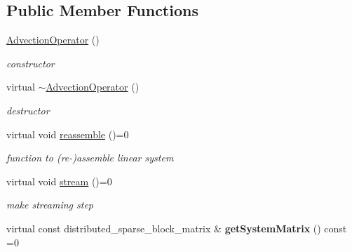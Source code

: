 \subsection*{Public Member Functions}
\begin{DoxyCompactItemize}
\item 
\hypertarget{classnatrium_1_1AdvectionOperator_a48d3a57e3433d9f6c3768ad2f392df56}{
\hyperlink{classnatrium_1_1AdvectionOperator_a48d3a57e3433d9f6c3768ad2f392df56}{AdvectionOperator} ()}
\label{classnatrium_1_1AdvectionOperator_a48d3a57e3433d9f6c3768ad2f392df56}

\begin{DoxyCompactList}\small\item\em constructor \item\end{DoxyCompactList}\item 
\hypertarget{classnatrium_1_1AdvectionOperator_a691156dace41e3075fd89953f30ae83f}{
virtual \hyperlink{classnatrium_1_1AdvectionOperator_a691156dace41e3075fd89953f30ae83f}{$\sim$AdvectionOperator} ()}
\label{classnatrium_1_1AdvectionOperator_a691156dace41e3075fd89953f30ae83f}

\begin{DoxyCompactList}\small\item\em destructor \item\end{DoxyCompactList}\item 
\hypertarget{classnatrium_1_1AdvectionOperator_a89c25c3dae9a1e5973cd89fab8c2c052}{
virtual void \hyperlink{classnatrium_1_1AdvectionOperator_a89c25c3dae9a1e5973cd89fab8c2c052}{reassemble} ()=0}
\label{classnatrium_1_1AdvectionOperator_a89c25c3dae9a1e5973cd89fab8c2c052}

\begin{DoxyCompactList}\small\item\em function to (re-\/)assemble linear system \item\end{DoxyCompactList}\item 
\hypertarget{classnatrium_1_1AdvectionOperator_aacdf6096f40166c5ec64686655c906a0}{
virtual void \hyperlink{classnatrium_1_1AdvectionOperator_aacdf6096f40166c5ec64686655c906a0}{stream} ()=0}
\label{classnatrium_1_1AdvectionOperator_aacdf6096f40166c5ec64686655c906a0}

\begin{DoxyCompactList}\small\item\em make streaming step \item\end{DoxyCompactList}\item 
\hypertarget{classnatrium_1_1AdvectionOperator_a2cbaee43740d976492e6c9d6d2b84ad0}{
virtual const distributed\_\-sparse\_\-block\_\-matrix \& {\bfseries getSystemMatrix} () const =0}
\label{classnatrium_1_1AdvectionOperator_a2cbaee43740d976492e6c9d6d2b84ad0}


\end{DoxyCompactItemize}
